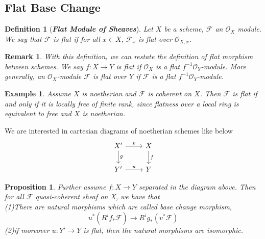 \documentclass{ctexart}
\newtheorem{definition}{Definition}[section]
\newtheorem{remark}{Remark}[section]
\newtheorem{proposition}{Proposition}[section]
\newtheorem{example}{Example}[section]
\begin{document}
\subsection{Flat Base Change}
\begin{definition}[\textbf{\emph{Flat Module of Sheaves}}]
    Let $X$ be a scheme, $\mathcal{F}$ an $\mathcal{O}_{X}$ module.
    We say that $\mathcal{F}$ is flat if for all $x\in X$, $\mathcal{F}_{x}$ is flat over $\mathcal{O}_{X, x}$.
\end{definition}
\begin{remark}
    With this definition, we can restate the definition of flat morphism between schemes.
    We say $f: X \longrightarrow Y$ is flat if $\mathcal{O}_{X}$ is a flat $f^{-1}\mathcal{O}_{Y}$-module.
    More generally, an $\mathcal{O}_{X}$-module $\mathcal{F}$ is flat over $Y$ if $\mathcal{F}$ is a flat $f^{-1}\mathcal{O}_{Y}$-module.
\end{remark}
\begin{example}
    Assume $X$ is noetherian and $\mathcal{F}$ is coherent on $X$.
    Then $\mathcal{F}$ is flat if and only if it is locally free of finite rank,
    since flatness over a local ring is equivalent to free and $X$ is noetherian.
\end{example}
We are interested in cartesian diagrams of noetherian schemes like below 
\begin{equation*}
    \begin{tikzcd}
        X' \arrow[r, "v"] \arrow[d, "g"] &
        X \arrow[d, "f"] \\
        Y' \arrow[r, "u"] &
        Y
    \end{tikzcd}
\end{equation*}
\begin{proposition}
    Further assume $f: X \longrightarrow Y$ separated in the diagram above.
    Then for all $\mathcal{F}$ quasi-coherent sheaf on X, we have that \\
    (1)There are natural morphisms which are called base change morphism,
    \begin{equation*}
        u^{\ast}(R^{i}f_{\ast}\mathcal{F}) \longrightarrow R^{i}g_{\ast}(v^{\ast}\mathcal{F})
    \end{equation*}
    (2)if moreover $u: Y' \longrightarrow Y$ is flat,
    then the natural morphisms are isomorphic.
    \label{Proposition 7.11}
\end{proposition}
\end{document}
